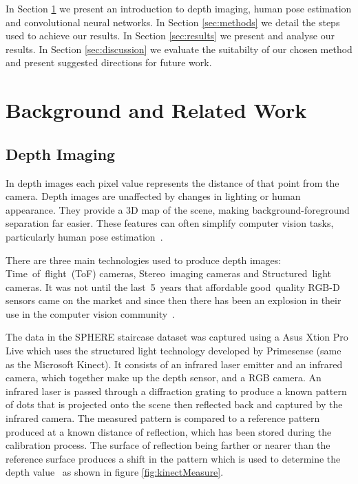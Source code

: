 \documentclass[11pt]{article} %
\begin{document}
In Section \ref{sec:bg} we present an introduction to depth imaging, human pose estimation and convolutional neural networks. In Section \ref{sec:methods} we detail the steps used to achieve our results. In Section \ref{sec:results} we present and analyse our results. In Section \ref{sec:discussion} we evaluate the suitabilty of our chosen method and present suggested directions for future work.






\section{Background and Related Work}
\label{sec:bg}
\subsection{Depth Imaging}
\label{sec:Depth}


In depth images each pixel value represents the distance of that point from the camera. Depth images are unaffected by changes in lighting or human appearance. They provide a 3D map of the scene, making background-foreground separation far easier. These features can often simplify computer vision tasks, particularly human pose estimation~\cite{Chen2013}.

There are three main technologies used to produce depth images: Time~of~flight~(ToF) cameras, Stereo~imaging cameras and Structured~light cameras. It was not until the last~5~years that affordable good~quality RGB-D sensors came on the market and since then there has been an explosion in their use in the computer vision community~\cite{Han2013}.

The data in the SPHERE staircase dataset was captured using a Asus Xtion Pro Live which uses the structured light technology developed by Primesense (same as the Microsoft Kinect). It consists of an infrared laser emitter and an infrared camera, which together make up the depth sensor, and a RGB camera. An infrared laser is passed through a diffraction grating to produce a known pattern of dots that is projected onto the scene then reflected back and captured by the infrared camera. The measured pattern is compared to a reference pattern produced at a known distance of reflection, which has been stored during the calibration process. The surface of reflection being farther or nearer than the reference surface produces a shift in the pattern which is used to determine the depth value~\cite{Zhang2012a,Khoshelham2012a} as shown in figure \ref{fig:kinectMeasure}.
\end{document}
